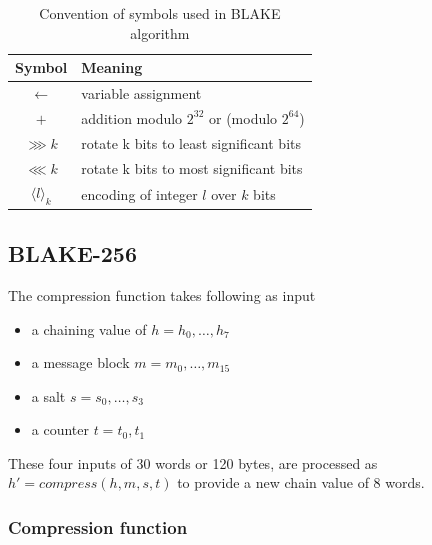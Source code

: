 \begin{table}[h]
  \begin{center}
    \begin{tabular}{ c l } \hline
      Symbol                  & Meaning \\ \hline
      $\gets$                 & variable assignment \\
      $+$                     & addition modulo $2^{32}$ or (modulo $2^{64}$) \\
      $\ggg k$                & rotate k bits to least significant bits \\
      $\lll k$                 & rotate k bits to most significant bits \\
      $\langle l \rangle_{k}$ & encoding of integer $l$ over $k$ bits \\ \hline
    \end{tabular}
    \caption{Convention of symbols used in BLAKE algorithm}
  \end{center}
\end{table}

\newpage

\subsection{ BLAKE-256 }

The compression function takes following as input
\begin{itemize}
  \item a chaining value of $h = h_{0},\dots, h_{7}$
  \item a message block $m = m_{0},\dots, m_{15}$
  \item a salt $s = s_{0},\dots, s_{3}$
  \item a counter $t = t_{0}, t_{1}$
\end{itemize}
These four inputs of 30 words or 120 bytes, are processed as $h' = compress(h, m, s, t)$ to provide a new
chain value of 8 words.

  \subsubsection{Compression function}

